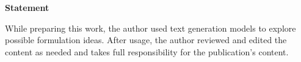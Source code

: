 \thispagestyle{empty}
\hspace{0pt}
\vfill
\begin{center}
\textbf{Statement}

While preparing this work, the author used text generation models to explore possible formulation ideas.
After usage, the author reviewed and edited the content as needed and takes full responsibility for the publication's content.

\end{center}
\vfill
\hspace{0pt}
